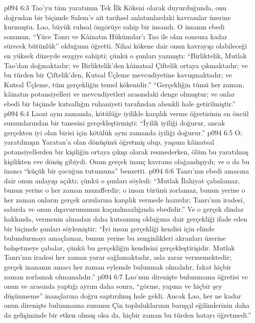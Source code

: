 \vs p094 6:3  Tao’yu tüm yaratımın Tek İlk Kökeni olarak duyurduğunda, onu doğrudan bir biçimde Salem’e ait tarihsel anlatımlardaki kavramlar üzerine kurmuştu. Lao, büyük ruhsal öngörüye sahip bir insandı. O insanın ebedi sonunun, “Yüce Tanrı ve Kâinatın Hükümdar’ı Tao ile olan sonsuza kadar sürecek bütünlük” olduğunu öğretti. Nihai kökene dair onun kavrayışı olabileceği en yüksek düzeyde sezgiye sahipti; çünkü o şunları yazmıştı: “Birliktelik, Mutlak Tao’dan doğmaktadır; ve Birliktelik’den kâinatsal Çiftelik ortaya çıkmaktadır; ve bu türden bir Çiftelik’den, Kutsal Üçleme mevcudiyetine kavuşmaktadır; ve Kutsal Üçleme, tüm gerçekliğin temel kökenidir.” “Gerçekliğin tümü her zaman, kâinatın potansiyelleri ve mevcudiyetleri arasındaki denge olmuştur; ve onlar ebedi bir biçimde kutsallığın ruhaniyeti tarafından ahenkli hale getirilmiştir.”
\vs p094 6:4 Laozi aynı zamanda, kötülüğe iyilikle karşılık verme öğretisinin en öncül sunumlarından bir tanesini gerçekleştirmişti: “İyilik iyiliği doğurur, ancak gerçekten iyi olan birisi için kötülük aynı zamanda iyiliği doğurur.”
\vs p094 6:5 O; yaratılmışın Yaratan’a olan dönüşünü öğretmiş olup, yaşamı kâinatsal potansiyellerden bir kişiliğin ortaya çıkışı olarak resmederken, ölüm bu yaratılmış kişilikten eve dönüş gibiydi. Onun gerçek inanç kavramı olağandışıydı; ve o da bu inancı “küçük bir çocuğun tutumuna” benzetti.
\vs p094 6:6 Tanrı’nın ebedi amacına dair onun anlayışı açıktı; çünkü o şunları söyledi: “Mutlak İlahiyat çabalamaz, bunun yerine o her zaman muzafferdir; o insan türünü zorlamaz, bunun yerine o her zaman onların gerçek arzularına karşılık vermede hazırdır; Tanrı’nın iradesi, sabırda ve onun dışavurumunun kaçınılmazlığında ebedidir.” Ve o gerçek dindar hakkında, vermenin almadan daha kutsanmış olduğuna dair gerçekliği ifade eden bir biçimde şunları söylemiştir: “İyi insan gerçekliği kendisi için elinde bulundurmayı amaçlamaz, bunun yerine bu zenginlikleri akranları üzerine bahşetmeye çabalar, çünkü bu gerçekliğin kendisini gerçekleştirişidir. Mutlak Tanrı’nın iradesi her zaman yarar sağlamaktadır, asla zarar vermemektedir; gerçek inananın amacı her zaman eylemde bulunmak olmalıdır, fakat hiçbir zaman zorlamak olmamalıdır.”
\vs p094 6:7 Lao’nun direnişte bulunmama öğretisi ve onun  ve  arasında yaptığı ayrım daha sonra, “görme, yapma ve hiçbir şey düşünmeme” inançlarına doğru saptırılmış hale geldi. Ancak Lao, her ne kadar onun direnişte bulunmama sunumu Çin topluluklarının barışçıl eğilimlerinin daha da gelişiminde bir etken olmuş olsa da, hiçbir zaman bu türden hatayı öğretmedi.”
